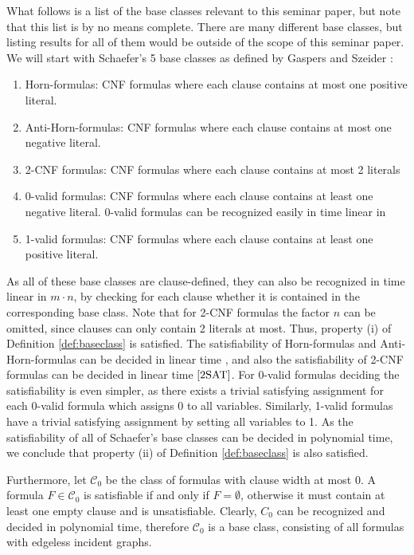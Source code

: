 \documentclass[11pt,a4paper]{article}
\theoremstyle{definition}
\theoremstyle{proposition}
\begin{document}
What follows is a list of the base classes relevant to this seminar paper, but note that this list is by no means complete. There are many different base classes, but listing results for all of them would be outside of the scope of this seminar paper. We will start with Schaefer's 5 base classes as defined by Gaspers and Szeider \cite[p.290f]{Gaspers2012}:
\begin{enumerate}
\item Horn-formulas: CNF formulas where each clause contains at most one positive literal. 
\item Anti-Horn-formulas: CNF formulas where each clause contains at most one negative literal. 
\item 2-CNF formulas: CNF formulas where each clause contains at most 2 literals
\item 0-valid formulas: CNF formulas where each clause contains at least one negative literal. 0-valid formulas can be recognized easily in time linear in 
\item 1-valid formulas: CNF formulas where each clause contains at least one positive literal. 
\end{enumerate}
As all of these base classes are clause-defined, they can also be recognized in time linear in $m \cdot n$, by checking for each clause whether it is contained in the corresponding base class. Note that for 2-CNF formulas the factor $n$ can be omitted, since clauses can only contain 2 literals at most. Thus, property (i) of Definition \ref{def:baseclass} is satisfied. The satisfiability of Horn-formulas and Anti-Horn-formulas can be decided in linear time \cite{HornSAT}, and also the satisfiability of 2-CNF formulas can be decided in linear time $\cite{2SAT}$. For 0-valid formulas deciding the satisfiability is even simpler, as there exists a trivial satisfying assignment for each 0-valid formula which assigns 0 to all variables. Similarly, 1-valid formulas have a trivial satisfying assignment by setting all variables to 1. As the satisfiability of all of Schaefer's base classes can be decided in polynomial time, we conclude that property (ii) of Definition \ref{def:baseclass} is also satisfied. 

Furthermore, let $\mathcal{C}_0$ be the class of formulas with clause width at most 0. A formula $F \in \mathcal{C}_0$ is satisfiable if and only if $F = \emptyset$, otherwise it must contain at least one empty clause and is unsatisfiable. Clearly, $C_0$ can be recognized and decided in polynomial time, therefore $\mathcal{C}_0$ is a base class, consisting of all formulas with edgeless incident graphs.  
\end{document}
